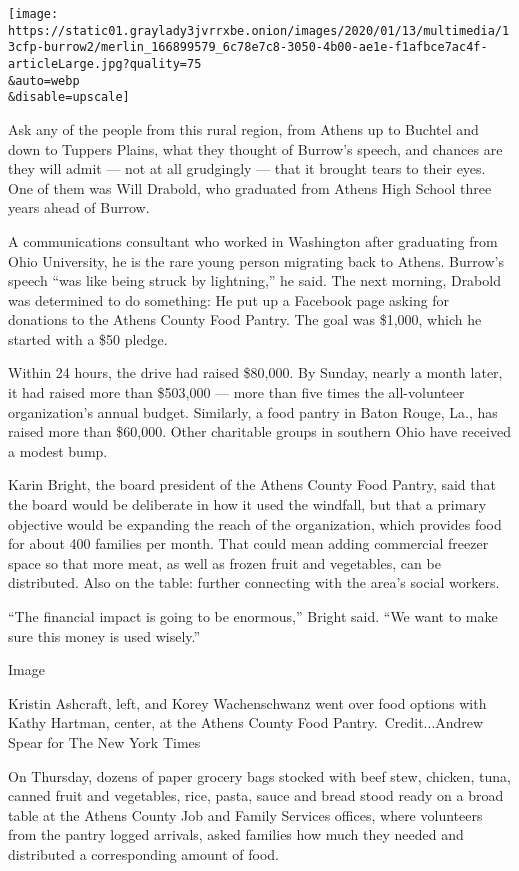 \texttt{[image: https://static01.graylady3jvrrxbe.onion/images/2020/01/13/multimedia/13cfp-burrow2/merlin\_166899579\_6c78e7c8-3050-4b00-ae1e-f1afbce7ac4f-articleLarge.jpg?quality=75\\\&auto=webp\\\&disable=upscale]}

Ask any of the people from this rural region, from Athens up to Buchtel
and down to Tuppers Plains, what they thought of Burrow's speech, and
chances are they will admit --- not at all grudgingly --- that it
brought tears to their eyes. One of them was Will Drabold, who graduated
from Athens High School three years ahead of Burrow.

A communications consultant who worked in Washington after graduating
from Ohio University, he is the rare young person migrating back to
Athens. Burrow's speech ``was like being struck by lightning,'' he said.
The next morning, Drabold was determined to do something: He put up a
Facebook page asking for donations to the Athens County Food Pantry. The
goal was \$1,000, which he started with a \$50 pledge.

Within 24 hours, the drive had raised \$80,000. By Sunday, nearly a
month later, it had raised more than \$503,000 --- more than five times
the all-volunteer organization's annual budget. Similarly, a food pantry
in Baton Rouge, La., has raised more than \$60,000. Other charitable
groups in southern Ohio have received a modest bump.

Karin Bright, the board president of the Athens County Food Pantry, said
that the board would be deliberate in how it used the windfall, but that
a primary objective would be expanding the reach of the organization,
which provides food for about 400 families per month. That could mean
adding commercial freezer space so that more meat, as well as frozen
fruit and vegetables, can be distributed. Also on the table: further
connecting with the area's social workers.

``The financial impact is going to be enormous,'' Bright said. ``We want
to make sure this money is used wisely.''

Image

Kristin Ashcraft, left, and Korey Wachenschwanz went over food options
with Kathy Hartman, center, at the Athens County Food
Pantry.~Credit...Andrew Spear for The New York Times

On Thursday, dozens of paper grocery bags stocked with beef stew,
chicken, tuna, canned fruit and vegetables, rice, pasta, sauce and bread
stood ready on a broad table at the Athens County Job and Family
Services offices, where volunteers from the pantry logged arrivals,
asked families how much they needed and distributed a corresponding
amount of food.

